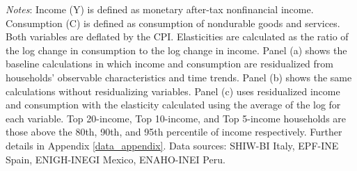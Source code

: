 \documentclass[12pt]{article}
\begin{document}
\begin{spacing}{1.5}
\begin{table}[H]
\raggedright{}\textit{\scriptsize{}Notes}{\scriptsize{}:
Income (Y) is defined as monetary after-tax nonfinancial income. Consumption (C) is defined as consumption of nondurable goods and services. Both variables are deflated by the CPI. Elasticities are calculated as the ratio of the log change in consumption to the log change in income. Panel (a) shows the baseline calculations in which income and consumption are residualized from households' observable characteristics and time trends. Panel (b) shows the same calculations without residualizing variables. Panel (c) uses residualized income and consumption with the elasticity calculated using the average of the log for each variable.  Top 20-income, Top 10-income, and Top 5-income households are those above the 80th, 90th, and 95th percentile of income respectively. Further details in Appendix \ref{data_appendix}. Data sources:  SHIW-BI Italy, EPF-INE Spain, ENIGH-INEGI Mexico, ENAHO-INEI Peru.}{\scriptsize\par}
\end{table}



\end{spacing}
\end{document}
